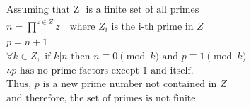 $$
\begin{aligned}
&\text{Assuming that Z }\text{ is a finite set of all primes} \\
&n = \prod_{}^{z \in Z} z \quad \text{where } Z_i \text{ is the i-th prime in } Z \\
&p = n+1 \\
&\forall k \in Z, \text{ if } k | n \text{ then } n \equiv 0 \pmod{k} \text{ and } p \equiv 1 \pmod{k} \\
&\therefore p \text{ has no prime factors except 1 and itself.} \\
&\text{Thus, } p \text{ is a new prime number not contained in } Z \\
&\text{and therefore, the set of primes is not finite.}
\end{aligned}
$$
